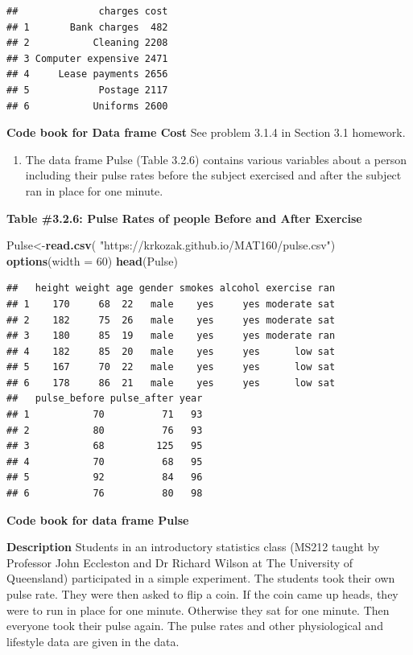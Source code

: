 \documentclass[
]{book}
\newenvironment{Shaded}{\begin{snugshade}}{\end{snugshade}}
\newcommand{\DataTypeTok}[1]{\textcolor[rgb]{0.13,0.29,0.53}{#1}}
\newcommand{\DecValTok}[1]{\textcolor[rgb]{0.00,0.00,0.81}{#1}}
\newcommand{\KeywordTok}[1]{\textcolor[rgb]{0.13,0.29,0.53}{\textbf{#1}}}
\newcommand{\NormalTok}[1]{#1}
\newcommand{\StringTok}[1]{\textcolor[rgb]{0.31,0.60,0.02}{#1}}
\providecommand{\tightlist}{%
  \setlength{\itemsep}{0pt}\setlength{\parskip}{0pt}}
\begin{document}
\begin{verbatim}
##              charges cost
## 1       Bank charges  482
## 2           Cleaning 2208
## 3 Computer expensive 2471
## 4     Lease payments 2656
## 5            Postage 2117
## 6           Uniforms 2600
\end{verbatim}

\textbf{Code book for Data frame Cost} See problem 3.1.4 in Section 3.1 homework.

\begin{enumerate}
\def\labelenumi{\arabic{enumi}.}
\setcounter{enumi}{4}
\tightlist
\item
  The data frame Pulse (Table 3.2.6) contains various variables about a person including their pulse rates before the subject exercised and after the subject ran in place for one minute.
\end{enumerate}

\textbf{Table \#3.2.6: Pulse Rates of people Before and After Exercise}

\begin{Shaded}
\begin{Highlighting}[]
\NormalTok{Pulse<-}\KeywordTok{read.csv}\NormalTok{(}
  \StringTok{"https://krkozak.github.io/MAT160/pulse.csv"}\NormalTok{)}
\KeywordTok{options}\NormalTok{(}\DataTypeTok{width =} \DecValTok{60}\NormalTok{)}
\KeywordTok{head}\NormalTok{(Pulse)}
\end{Highlighting}
\end{Shaded}

\begin{verbatim}
##   height weight age gender smokes alcohol exercise ran
## 1    170     68  22   male    yes     yes moderate sat
## 2    182     75  26   male    yes     yes moderate sat
## 3    180     85  19   male    yes     yes moderate ran
## 4    182     85  20   male    yes     yes      low sat
## 5    167     70  22   male    yes     yes      low sat
## 6    178     86  21   male    yes     yes      low sat
##   pulse_before pulse_after year
## 1           70          71   93
## 2           80          76   93
## 3           68         125   95
## 4           70          68   95
## 5           92          84   96
## 6           76          80   98
\end{verbatim}

\textbf{Code book for data frame Pulse}

\textbf{Description}
Students in an introductory statistics class (MS212 taught by Professor John Eccleston and Dr Richard Wilson at The University of Queensland) participated in a simple experiment. The students took their own pulse rate. They were then asked to flip a coin. If the coin came up heads, they were to run in place for one minute. Otherwise they sat for one minute. Then everyone took their pulse again. The pulse rates and other physiological and lifestyle data are given in the data.
\end{document}

